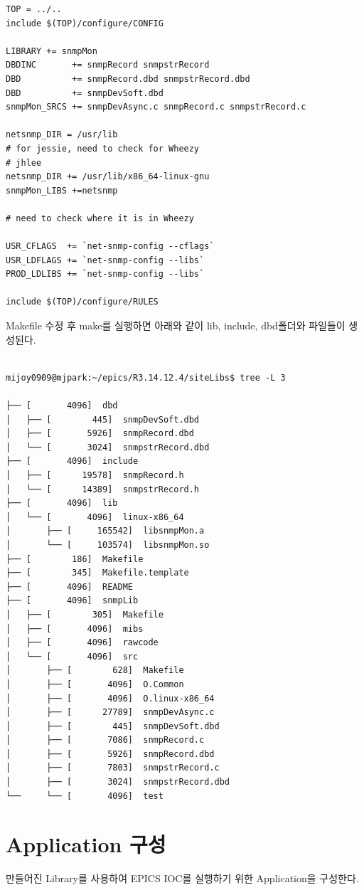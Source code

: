 \documentclass[11pt
  , a4paper
  , article
  , oneside
]{memoir}
\begin{document}
\begin{lstlisting}[style=termstylenumber]
TOP = ../..
include $(TOP)/configure/CONFIG

LIBRARY += snmpMon
DBDINC       += snmpRecord snmpstrRecord
DBD          += snmpRecord.dbd snmpstrRecord.dbd
DBD          += snmpDevSoft.dbd
snmpMon_SRCS += snmpDevAsync.c snmpRecord.c snmpstrRecord.c

netsnmp_DIR = /usr/lib
# for jessie, need to check for Wheezy
# jhlee
netsnmp_DIR += /usr/lib/x86_64-linux-gnu
snmpMon_LIBS +=netsnmp

# need to check where it is in Wheezy

USR_CFLAGS  += `net-snmp-config --cflags`
USR_LDFLAGS += `net-snmp-config --libs`
PROD_LDLIBS += `net-snmp-config --libs`

include $(TOP)/configure/RULES      
\end{lstlisting}

Makefile 수정 후 make를 실행하면 아래와 같이 lib, include, dbd폴더와 파일들이 생성된다.

    {\scriptsize
         \begin{verbatim}
    
mijoy0909@mjpark:~/epics/R3.14.12.4/siteLibs$ tree -L 3

├── [       4096]  dbd
│   ├── [        445]  snmpDevSoft.dbd
│   ├── [       5926]  snmpRecord.dbd
│   └── [       3024]  snmpstrRecord.dbd
├── [       4096]  include
│   ├── [      19578]  snmpRecord.h
│   └── [      14389]  snmpstrRecord.h
├── [       4096]  lib
│   └── [       4096]  linux-x86_64
│       ├── [     165542]  libsnmpMon.a
│       └── [     103574]  libsnmpMon.so
├── [        186]  Makefile
├── [        345]  Makefile.template
├── [       4096]  README
├── [       4096]  snmpLib
│   ├── [        305]  Makefile
│   ├── [       4096]  mibs
│   ├── [       4096]  rawcode
│   └── [       4096]  src
│       ├── [        628]  Makefile
│       ├── [       4096]  O.Common
│       ├── [       4096]  O.linux-x86_64
│       ├── [      27789]  snmpDevAsync.c
│       ├── [        445]  snmpDevSoft.dbd
│       ├── [       7086]  snmpRecord.c
│       ├── [       5926]  snmpRecord.dbd
│       ├── [       7803]  snmpstrRecord.c
│       ├── [       3024]  snmpstrRecord.dbd
└──     └── [       4096]  test
     \end{verbatim}
     }

\section{Application 구성}
만들어진 Library를 사용하여 EPICS IOC를 실행하기 위한 Application을 구성한다.
\end{document}
